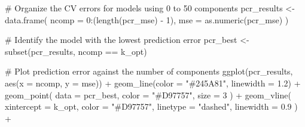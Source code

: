 \documentclass[
  letterpaper,
  DIV=11,
  numbers=noendperiod]{scrreprt}
\newenvironment{Shaded}{\begin{snugshade}}{\end{snugshade}}
\newcommand{\AttributeTok}[1]{\textcolor[rgb]{0.40,0.45,0.13}{#1}}
\newcommand{\CommentTok}[1]{\textcolor[rgb]{0.37,0.37,0.37}{#1}}
\newcommand{\DecValTok}[1]{\textcolor[rgb]{0.68,0.00,0.00}{#1}}
\newcommand{\FloatTok}[1]{\textcolor[rgb]{0.68,0.00,0.00}{#1}}
\newcommand{\FunctionTok}[1]{\textcolor[rgb]{0.28,0.35,0.67}{#1}}
\newcommand{\NormalTok}[1]{\textcolor[rgb]{0.00,0.23,0.31}{#1}}
\newcommand{\OtherTok}[1]{\textcolor[rgb]{0.00,0.23,0.31}{#1}}
\newcommand{\SpecialCharTok}[1]{\textcolor[rgb]{0.37,0.37,0.37}{#1}}
\newcommand{\StringTok}[1]{\textcolor[rgb]{0.13,0.47,0.30}{#1}}
\begin{document}
\begin{Shaded}
\begin{Highlighting}[]
\CommentTok{\# Organize the CV errors for models using 0 to 50 components}
\NormalTok{pcr\_results }\OtherTok{\textless{}{-}} \FunctionTok{data.frame}\NormalTok{(}
  \AttributeTok{ncomp =} \DecValTok{0}\SpecialCharTok{:}\NormalTok{(}\FunctionTok{length}\NormalTok{(pcr\_mse) }\SpecialCharTok{{-}} \DecValTok{1}\NormalTok{),}
  \AttributeTok{mse =} \FunctionTok{as.numeric}\NormalTok{(pcr\_mse)}
\NormalTok{)}

\CommentTok{\# Identify the model with the lowest prediction error}
\NormalTok{pcr\_best }\OtherTok{\textless{}{-}} \FunctionTok{subset}\NormalTok{(pcr\_results, ncomp }\SpecialCharTok{==}\NormalTok{ k\_opt)}

\CommentTok{\# Plot prediction error against the number of components}
\FunctionTok{ggplot}\NormalTok{(pcr\_results, }\FunctionTok{aes}\NormalTok{(}\AttributeTok{x =}\NormalTok{ ncomp, }\AttributeTok{y =}\NormalTok{ mse)) }\SpecialCharTok{+}
  \FunctionTok{geom\_line}\NormalTok{(}\AttributeTok{color =} \StringTok{"\#245A81"}\NormalTok{, }\AttributeTok{linewidth =} \FloatTok{1.2}\NormalTok{) }\SpecialCharTok{+}
  \FunctionTok{geom\_point}\NormalTok{(}
    \AttributeTok{data =}\NormalTok{ pcr\_best,}
    \AttributeTok{color =} \StringTok{"\#D97757"}\NormalTok{, }\AttributeTok{size =} \DecValTok{3}
\NormalTok{  ) }\SpecialCharTok{+}
  \FunctionTok{geom\_vline}\NormalTok{(}
    \AttributeTok{xintercept =}\NormalTok{ k\_opt,}
    \AttributeTok{color =} \StringTok{"\#D97757"}\NormalTok{, }\AttributeTok{linetype =} \StringTok{"dashed"}\NormalTok{,}
    \AttributeTok{linewidth =} \FloatTok{0.9}
\NormalTok{  ) }\SpecialCharTok{+}
  

\end{Highlighting}
\end{Shaded}
\end{document}
